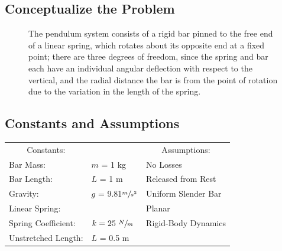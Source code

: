\documentclass[12pt]{report}
\begin{document}

{\tableofcontents\let\clearpage\relax\listoffigures}
\clearpage
{}
\newpage
\begin{flushleft}

\section{Conceptualize the Problem}
\begin{figure}[h]
  \begin{minipage}[c]{.4\textwidth}
  
\end{minipage}%
\begin{minipage}[c]{.6\textwidth}
  The pendulum system consists of a rigid bar pinned to the free end of a linear spring,
  which rotates about its opposite end at a fixed point; there are three degrees of freedom,
  since the spring and bar each have an individual angular deflection with respect to the vertical,
  and the radial distance the bar is from the point of rotation due to the variation in the
  length of the spring.
\end{minipage}
\end{figure}

\subsection{Constants and Assumptions}
\begin{tabular}{ll@{\hskip .75in}l}
 \multicolumn{1}{c}{Constants:} && \multicolumn{1}{c}{Assumptions:} \\
 Bar Mass: &$m$ = 1 kg & No Losses\\
 Bar Length: &$L$ = 1 m & Released from Rest\\
 Gravity: &$g$ = 9.81$\sfrac{m}{s^2}$ &Uniform Slender Bar \\
 Linear Spring: &&Planar\\
 \quad Spring Coefficient:& $k = 25~\sfrac{N}{m}$ &Rigid-Body Dynamics \\
 \quad Unstretched Length:& $L$ = 0.5 m \\
\end{tabular}
\vspace{5ex}


\end{flushleft}
\end{document}
